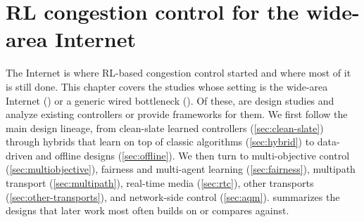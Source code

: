 \chapter{RL congestion control for the wide-area Internet}
\label{ch:internet}

The Internet is where RL-based congestion control started and where most of it is still done. This chapter covers the \nChInternetN{} studies whose setting is the wide-area Internet (\nSetWan) or a generic wired bottleneck (\nSetGen). Of these, \nChInternetDesign{} are design studies and \nChInternetAnalysis{} analyze existing controllers or provide frameworks for them. We first follow the main design lineage, from clean-slate learned controllers (\cref{sec:clean-slate}) through hybrids that learn on top of classic algorithms (\cref{sec:hybrid}) to data-driven and offline designs (\cref{sec:offline}). We then turn to multi-objective control (\cref{sec:multiobjective}), fairness and multi-agent learning (\cref{sec:fairness}), multipath transport (\cref{sec:multipath}), real-time media (\cref{sec:rtc}), other transports (\cref{sec:other-transports}), and network-side control (\cref{sec:aqm}).  summarizes the designs that later work most often builds on or compares against.

